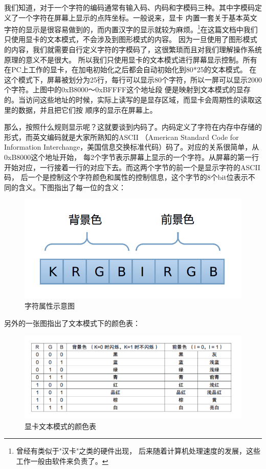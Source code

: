 \par 我们知道，对于一个字符的编码通常有输入码、内码和字模码三种。其中字模码定义了一个字符在屏幕上显示的点阵坐标。一般说来，显卡\allowbreak
内置一套关于基本英文字符的显示是很容易做到的，而内置汉字的显示就较为麻烦。\footnote{曾经有类似于"汉卡"之类的硬件出现，\allowbreak
后来随着计算机处理速度的发展，这些工作一般由软件来负责了。}在这篇文档中我们只使用显卡的文本模式，不会涉及到图形模式的内容。\allowbreak
因为一旦使用了图形模式的内容，我们就需要自行定义字符的字模码了，这很繁琐而且对我们理解操作系统原理的意义不是很大。\allowbreak
所以我们只使用显卡的文本模式进行屏幕显示控制。所有在PC上工作的显卡，在加电初始化之后都会自动初始化到80*25的文本模式。\allowbreak
在这个模式下，屏幕被划分为25行，每行可以显示80个字符，所以一屏可以显示2000个字符。上图中的0xB8000～0xBFFFF这个地址段\allowbreak
便是映射到文本模式的显存的。当访问这些地址的时候，实际上读写的是显存区域，而显卡会周期性的读取这里的数据，并且把它们按\allowbreak
顺序的显示在屏幕上。

\par 那么，按照什么规则显示呢？这就要谈到内码了。内码定义了字符在内存中存储的形式，而英文编码就是大家所熟知的ASCII\allowbreak
（American Standard Code for Information Interchange，美国信息交换标准代码）码了。对应的关系很简单，从0xB8000这个地址开始，\allowbreak
每2个字节表示屏幕上显示的一个字符。从屏幕的第一行开始对应，一行接着一行的对应下去。而这两个字节的前一个是显示字符的ASCII码，\allowbreak
后一个是控制这个字符颜色和属性的控制信息，这个字节的8个bit位表示不同的含义。下图指出了每一位的含义：

\begin{figure}[ht]
      \centering
      \includegraphics[scale=0.25]{picture/chapt4/char_color.png}
      \caption{字符属性示意图}
\end{figure}

\par 另外的一张图指出了文本模式下的颜色表：

\begin{figure}[ht]
      \centering
      \includegraphics[scale=0.4]{picture/chapt4/text_mode_color.png}
      \caption{显卡文本模式的颜色表}
\end{figure}

